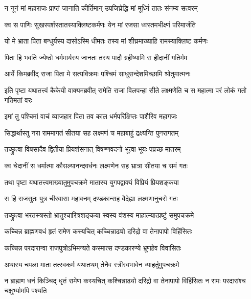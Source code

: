 \twolineshloka
{न नूनं मां महाराजः प्राप्तं जानाति कीर्तिमान्}
{उपजिघ्रेद्धि मां मूर्ध्नि तातः संनम्य सत्वरम्} %

\twolineshloka
{क्व स पाणिः सुखस्पर्शस्तातस्याक्लिष्टकर्मणः}
{येन मां रजसा ध्वस्तमभीक्ष्णं परिमार्जति} %

\twolineshloka
{यो मे भ्राता पिता बन्धुर्यस्य दासोऽस्मि धीमतः}
{तस्य मां शीघ्रमाख्याहि रामस्याक्लिष्ट कर्मणः} %

\twolineshloka
{पिता हि भवति ज्येष्ठो धर्ममार्यस्य जानतः}
{तस्य पादौ ग्रहीष्यामि स हीदानीं गतिर्मम} %

\twolineshloka
{आर्ये किमब्रवीद् राजा पिता मे सत्यविक्रमः}
{पश्चिमं साधुसन्देशमिच्छामि श्रोतुमात्मनः} %

\threelineshloka
{इति पृष्टा यथातत्त्वं कैकेयी वाक्यमब्रवीत्}
{रामेति राजा विलपन्हा सीते लक्ष्मणेति च}
{स महात्मा परं लोकं गतो गतिमतां वरः} %

\twolineshloka
{इमां तु पश्चिमां वाचं व्याजहार पिता तव}
{काल धर्मपरिक्षिप्तः पाशैरिव महागजः} %

\twolineshloka
{सिद्धार्थास्तु नरा राममागतं सीतया सह}
{लक्ष्मणं च महाबाहुं द्रक्ष्यन्ति पुनरागतम्} %

\twolineshloka
{तच्छ्रुत्वा विषसादैव द्वितीया प्रियशंसनात्}
{विषण्णवदनो भूत्वा भूयः पप्रच्छ मातरम्} %

\twolineshloka
{क्व चेदानीं स धर्मात्मा कौसल्यानन्दवर्धनः}
{लक्ष्मणेन सह भ्रात्रा सीतया च समं गतः} %

\twolineshloka
{तथा पृष्टा यथातत्त्वमाख्यातुमुपचक्रमे}
{मातास्य युगपद्वाक्यं विप्रियं प्रियशङ्कया} %

\twolineshloka
{स हि राजसुतः पुत्र चीरवासा महावनम्}
{दण्डकान्सह वैदेह्या लक्ष्मणानुचरो गतः} %

\twolineshloka
{तच्छ्रुत्वा भरतस्त्रस्तो भ्रातुश्चारित्रशङ्कया}
{स्वस्य वंशस्य माहात्म्यात्प्रष्टुं समुपचक्रमे} %

\twolineshloka
{कच्चिन्न ब्राह्मणवधं हृतं रामेण कस्यचित्}
{कच्चिन्नाढ्यो दरिद्रो वा तेनापापो विहिंसितः} %

\twolineshloka
{कच्चिन्न परदारान्वा राजपुत्रोऽभिमन्यते}
{कस्मात्स दण्डकारण्ये भ्रूणहेव विवासितः} %

\twolineshloka
{अथास्य चपला माता तत्स्वकर्म यथातथम्}
{तेनैव स्त्रीस्वभावेन व्याहर्तुमुपचक्रमे} %

\threelineshloka
{न ब्राह्मण धनं किञ्चिद् धृतं रामेण कस्यचित्}
{कश्चिन्नाढ्यो दरिद्रो वा तेनापापो विहिंसितः}
{न रामः परदारांश्च चक्षुर्भ्यामपि पश्यति} %

